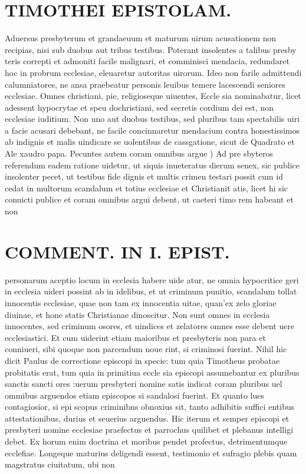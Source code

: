 \documentclass{article}
\begin{document}
\begin{pages}
\section*{TIMOTHEI EPISTOLAM. }
\marginpar{[ p.143 ]}\pstart Aduersus presbyterum et grandaeuum et maturum uirum acusationem non recipias, nisi sub duobus aut tribus testibus. Poterant insolentes a talibus presby teris correpti et admoniti facile malignari, et comminisci mendacia, redundaret hoc in probrum ecclesiae, eleuaretur autoritas uirorum. Ideo non farile admittendi calumniatores, ne ansa praebeatur personis leuibus temere lacescendi seniores ecclesiae.  \pend\pstart Omnes christiani, pie, religioseque uiuentes, Eccle sia nominabatur, licet adessent hypocrytae et speu dochristiani, sed secretis cordium dei est, non ecclesiae iuditium. Non uno aut duobus testibus, sed pluribus tam spectabilis uiri a facie acusari debebant, ne facile concinnaretur mendacium contra honestissimos ab indignis et malis uindicare se uolentibus de cassgatione, sicut de Quadrato et Ale xaudro papa.  \pend\pstart Pecuntes autem coram omnibus argue ) Ad pre sbyteros referendum eadem ratione uidetur, ut siquis inueteratus dierum senex, sic publice insolenter pecet, ut testibus fide dignis et multis crimen testari possit cum id cedat in multorum scandalum et totius ecclesiae et Christianit atis, licet hi sic conuicti publice et coram omnibus argui debent, ut caeteri timo rem habeant et non  \pend
\section*{COMMENT. IN I. EPIST. }
\marginpar{[ p.144 ]}\pstart personarum aceptio locum in ecclesia habere uide atur, ne omnia hypocritice geri in ecclesia uideri possint ab in idelibus, et ut criminum punitio, scandalum tollat innocentis ecclesiae, quae non tam ex innocentia uitae, quan'ex zelo gloriae diuinae, et hone statis Christianae dinoscitur. Non sunt omnes in ecclesia innocentes, sed criminum osores, et uindices et zelatores omnes esse debent uere ecclesiastici. Et cum uiderint etiam maioribus et presbyteris non para et conniueri, sibi quoque non parcendum noue rint, si criminosi fuerint. Nihil hic dicit Paulus de correctione episcopi in specie: tum quia Timotheus probatae probitatis erat, tum quia in primitiua eccle sia episcopi assumebantur ex pluribus sanctis sancti ores :uerum presbyteri nomine satis indicat coram pluribus uel ommibus arguendos etiam episcopos si sandalosi fuerint. Et quanto lues contagiosior, si epi scopus criminibns obnoxius sit, tanto adhibitis suffici entibus attestationibus, durius et seuerius arguendus. Hic iterum et semper episcopi et presbyteri nomine ecclesiae praefectus et parrochus quilibet et plebanus intelligi debet. Ex horum enim doctrina et moribus pendet profectus, detrimentumque ecclefiae. Longeque maturius deligendi essent, testimonio et sufragio plebis quam magstratus ciuitatum, ubi non  \pend

\end{pages}
\end{document}
